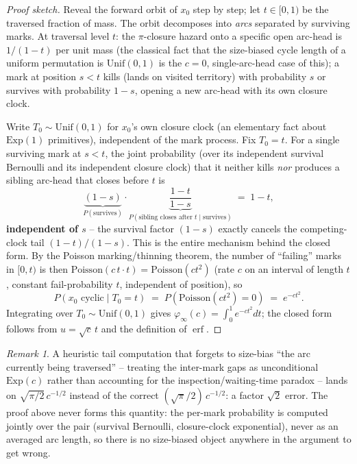 \documentclass[11pt]{article}
\theoremstyle{remark}
\newtheorem*{remark}{Remark}
\newcommand{\phiinf}{\varphi_\infty}
\newcommand{\Unif}{\mathrm{Unif}}
\newcommand{\Exp}{\mathrm{Exp}}
\begin{document}
\begin{proof}[Proof sketch]
Reveal the forward orbit of $x_0$ step by step; let $t\in[0,1)$ be the
traversed fraction of mass. The orbit decomposes into \emph{arcs}
separated by surviving marks. At traversal level $t$: the
$\pi$-closure hazard onto a specific open arc-head is $1/(1-t)$ per unit
mass (the classical fact that the size-biased cycle length of a uniform
permutation is $\Unif(0,1)$ is the $c=0$, single-arc-head case of this);
a mark at position $s<t$ kills (lands on visited territory) with
probability $s$ or survives with probability $1-s$, opening a new
arc-head with its own closure clock.

Write $T_0\sim\Unif(0,1)$ for $x_0$'s own closure clock (an elementary
fact about $\Exp(1)$ primitives), independent of the mark process. Fix
$T_0=t$. For a single surviving mark at $s<t$, the joint probability
(over its independent survival Bernoulli and its independent closure
clock) that it neither kills \emph{nor} produces a sibling arc-head that
closes before $t$ is
\[
  \underbrace{(1-s)}_{P(\text{survives})}\cdot\underbrace{\frac{1-t}{1-s}}_{P(\text{sibling closes after } t\mid \text{survives})} \;=\; 1-t,
\]
\textbf{independent of $s$} -- the survival factor $(1-s)$ exactly
cancels the competing-clock tail $(1-t)/(1-s)$. This is the entire
mechanism behind the closed form. By the Poisson marking/thinning
theorem, the number of ``failing'' marks in $[0,t)$ is then
$\mathrm{Poisson}(c\, t\cdot t)=\mathrm{Poisson}(ct^2)$ (rate $c$ on an
interval of length $t$, constant fail-probability $t$, independent of
position), so
\[
  P(x_0 \text{ cyclic}\mid T_0=t) \;=\; P(\mathrm{Poisson}(ct^2)=0) \;=\; e^{-ct^2}.
\]
Integrating over $T_0\sim\Unif(0,1)$ gives $\phiinf(c)=\int_0^1 e^{-ct^2}dt$;
the closed form follows from $u=\sqrt c\,t$ and the definition of
$\operatorname{erf}$.
\end{proof}

\begin{remark}
A heuristic tail computation that forgets to size-bias ``the arc
currently being traversed'' -- treating the inter-mark gaps as
unconditional $\Exp(c)$ rather than accounting for the
inspection/waiting-time paradox -- lands on $\sqrt{\pi/2}\,c^{-1/2}$
instead of the correct $(\sqrt\pi/2)\,c^{-1/2}$: a factor $\sqrt2$ error.
The proof above never forms this quantity: the per-mark probability is
computed jointly over the pair (survival Bernoulli, closure-clock
exponential), never as an averaged arc length, so there is no
size-biased object anywhere in the argument to get wrong.
\end{remark}
\end{document}
